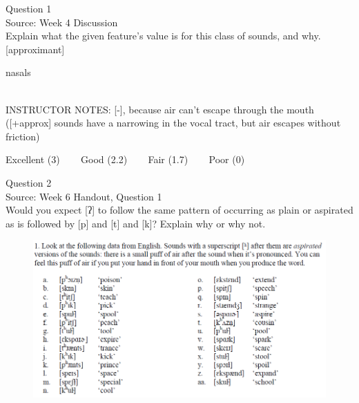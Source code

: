 \documentclass[12pt]{article}
\begin{document}
\begin{center}
\textbf{{\color{violet}{\HUGE 20201021 Wednesday\\}}}

\textbf{{\color{violet}{\HUGE ALL EXAMS (with notes)\\}}}

\end{center}
\newpage

\begin{center}
\textbf{{\color{blue}{\HUGE START OF EXAM\\}}}

\textbf{{\color{blue}{\HUGE Student ID: 62089\\}}}

\textbf{{\color{blue}{\HUGE 4:00\\}}}

\end{center}
\newpage

{\large Question 1}\\

Source: Week 4 Discussion\\

Explain what the given feature’s value is for this class of sounds, and why.\\

{[approximant]}

nasals


~\\
INSTRUCTOR NOTES: [-], because air can't escape through the mouth ([+approx] sounds have a narrowing in the vocal tract, but air escapes without friction)


\vfill
Excellent (3) ~~~ Good (2.2) ~~~ Fair (1.7) ~~~ Poor (0)
\newpage

{\large Question 2}\\

Source: Week 6 Handout, Question 1\\

Would you expect [ʔ] to follow the same pattern of occurring as plain or aspirated as is followed by [p] and [t] and [k]? Explain why or why not.\\

\begin{figure}[H]
\includegraphics{../images/aspiration.png}
\end{figure}
\end{document}
